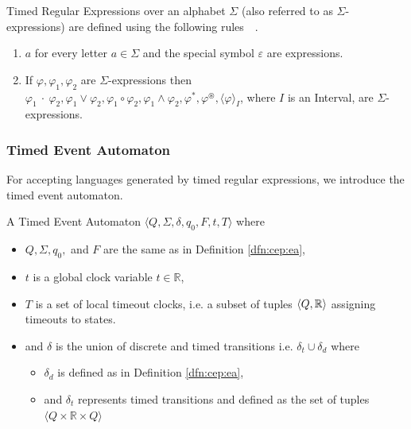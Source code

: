 			\begin{dfn}
				\label{dfn:cep:tre}
				Timed Regular Expressions over an alphabet $\Sigma$ (also referred to as $\Sigma$-expressions)
				are defined using the following rules~\citep{tre}~.
				\begin{enumerate}
					\item \underline{$a$} for every letter $a \in \Sigma$ and the special symbol $\varepsilon$ are expressions.
					\item If $\varphi, \varphi_1, \varphi_2$ are $\Sigma$-expressions then %
						$ %
						\varphi_1~\cdot~\varphi_2,
						\varphi_1 \vee \varphi_2,
						\varphi_1 \circ \varphi_2,
						\varphi_1 \wedge \varphi_2,
						\varphi^\ast,
						\varphi^\circledast,
						\langle \varphi \rangle_I$, 
						where $I$ is an Interval, are $\Sigma$-expressions.
				\end{enumerate}
			\end{dfn}
			
			\subsubsection{Timed Event Automaton}
				For accepting languages generated by timed regular expressions, we introduce the timed event automaton.
				
				\begin{dfn}
					\label{dfn:cep:tea}
					A Timed Event Automaton $\langle Q,\Sigma,\delta,q_0, F, t, T \rangle$ where
					\begin{itemize}
						\item $Q, \Sigma, q_0,$ and $F$ are the same as in Definition \ref{dfn:cep:ea},
						\item $t$ is a global clock variable $t \in \mathbb{R}$,
						\item $T$ is a set of local timeout clocks, i.e. a subset of tuples $\langle Q, \mathbb{R} \rangle$ assigning timeouts to states.
						\item and $\delta$ is the union of discrete and timed transitions i.e. $\delta_t \cup \delta_d$ where
						\begin{itemize}
							\item $\delta_d$ is defined as in Definition \ref{dfn:cep:ea},
							\item and $\delta_t$ represents timed transitions and defined as the set of tuples $\langle Q \times \mathbb{R} \times Q \rangle$ 
						\end{itemize}
					\end{itemize}
				\end{dfn}
				
